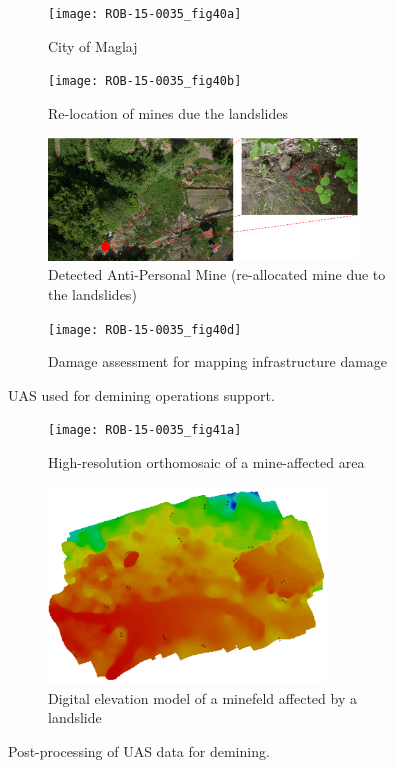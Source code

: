 \documentclass{article}
\begin{document}
\begin{figure}
\centering
 \begin{subfigure} [b]{0.49\textwidth}     \centering     	\texttt{[image: ROB-15-0035\_fig40a]}	\caption{City of Maglaj} 					\label{fig:UASp4} 	\end{subfigure}
 \begin{subfigure} [b]{0.49\textwidth} 	\centering 	\texttt{[image: ROB-15-0035\_fig40b]}   	\caption{Re-location of mines due the landslides}  	\label{fig:UASp5}	\end{subfigure}
 \begin{subfigure} [b]{0.49\textwidth} 	\centering 	\includegraphics[width=0.9\textwidth]{ROB-15-0035_fig40c}   	\caption{Detected Anti-Personal Mine (re-allocated mine due to the landslides)}  		\label{fig:diexp}	\end{subfigure}
 \begin{subfigure} [b]{0.49\textwidth}		\centering \texttt{[image: ROB-15-0035\_fig40d]}		\caption{Damage assessment for mapping infrastructure damage}		\label{fig:UASp3}  		\end{subfigure}
 \caption{UAS used for demining operations support.}
 \label{fig:frmapa}
 \end{figure}

\begin{figure}
\centering
 \begin{subfigure} [b]{\textwidth}     \centering     	\texttt{[image: ROB-15-0035\_fig41a]}	\caption{High-resolution orthomosaic of a mine-affected area} 					\label{fig:UASp7} 	\end{subfigure}
 \begin{subfigure} [b]{\textwidth} 	\centering 	\includegraphics[width=0.81\textwidth, angle=350]{ROB-15-0035_fig41b}   	\caption{Digital elevation model of a minefeld affected by a landslide}  	\label{fig:UASp8}	\end{subfigure}
 \caption{Post-processing of UAS data for demining.}
 \label{fig:frmap}
 \end{figure}
\end{document}
